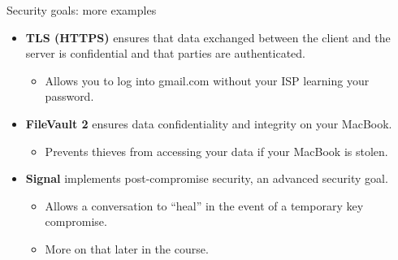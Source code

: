 \documentclass[aspectratio=169, lualatex, handout]{beamer}
\begin{document}
	\begin{frame}{Security goals: more examples}
		\begin{itemize}
			\pause

			\item \textbf{TLS (HTTPS)} ensures that data exchanged between the client
				and the server is confidential and that parties are authenticated.
				\begin{itemize}
					\item Allows you to log into gmail.com without your ISP learning your password.
				\end{itemize}

				\pause

			\item \textbf{FileVault 2} ensures data confidentiality and integrity on
				your MacBook.
				\begin{itemize}
					\item Prevents thieves from accessing your data if your MacBook is stolen.
				\end{itemize}

				\pause

			\item \textbf{Signal} implements post-compromise security, an advanced security
				goal.
				\begin{itemize}
					\item Allows a conversation to ``heal'' in the event of a temporary key
						compromise.

					\item More on that later in the course.
				\end{itemize}
		\end{itemize}
	\end{frame}
\end{document}
